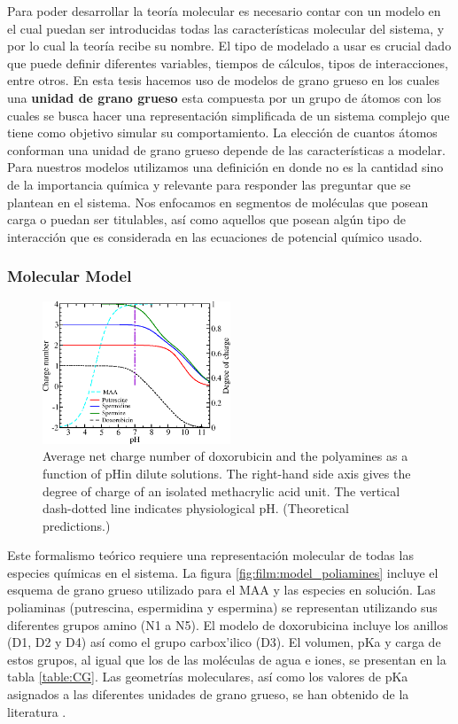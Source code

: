 Para poder desarrollar la teor\'ia molecular es necesario contar con un modelo en el cual puedan ser introducidas todas las caracter\'isticas molecular del sistema, y por lo cual la teor\'ia recibe su nombre.
El tipo de modelado a usar es crucial dado que puede definir diferentes variables, tiempos de c\'alculos, tipos de interacciones, entre otros. 
En esta tesis hacemos uso de modelos de grano grueso en los cuales una \textbf{unidad de grano grueso} esta compuesta por un grupo de \'atomos con los cuales  se busca hacer una representaci\'on simplificada de un sistema complejo que tiene como objetivo simular su comportamiento.
La elecci\'on de cuantos \'atomos conforman una unidad de grano grueso depende de las caracter\'isticas a modelar. 
Para nuestros modelos utilizamos una definici\'on en donde no es la cantidad sino de la importancia qu\'imica y relevante para responder las preguntar que se plantean en el sistema. Nos enfocamos en segmentos de mol\'eculas que posean carga o puedan ser titulables, as\'i como aquellos que posean alg\'un tipo de interacci\'on que es considerada en las ecuaciones de potencial qu\'imico usado.

\subsubsection{Molecular Model}


\begin{figure}[ht]
	\centering
	\includegraphics[width=0.5\textwidth]{Figures/graph-film/chargeAds.png}
	\caption{Average net charge number of doxorubicin and the polyamines as a function of pHin dilute solutions.
	The right-hand side axis gives the degree of charge of an isolated methacrylic acid unit. The vertical dash-dotted line indicates physiological pH. (Theoretical predictions.)}
	\label{fig:model}
\end{figure}


Este formalismo te\'orico requiere una representaci\'on molecular de todas las especies qu\'imicas en el sistema. La figura \ref{fig:film:model_poliamines} incluye el esquema de grano grueso utilizado para el MAA y las especies en soluci\'on. Las poliaminas (putrescina, espermidina y espermina) se representan utilizando sus diferentes grupos amino (N1 a N5). El modelo de doxorubicina incluye los anillos (D1, D2 y D4) as\'i como el grupo carbox'ilico (D3). El volumen, pKa y carga de estos grupos, al igual que los de las mol\'eculas de agua e iones, se presentan en la tabla \ref{table:CG}. Las geometr\'ias moleculares, as\'i como los valores de pKa asignados a las diferentes unidades de grano grueso, se han obtenido de la literatura .

